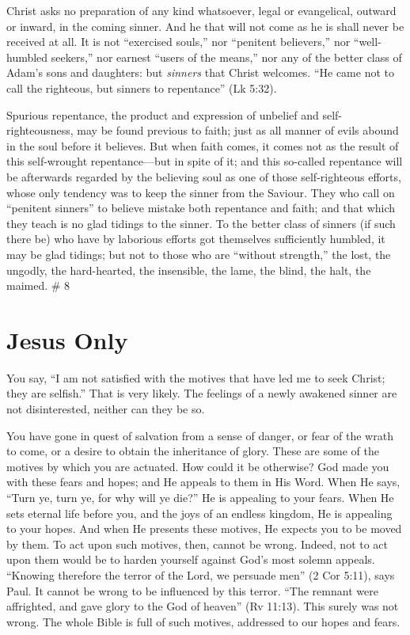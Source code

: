 \documentclass[
]{book}
\begin{document}
Christ asks no preparation of any kind whatsoever, legal or evangelical, outward or inward, in the coming sinner. And he that will not come as he is shall never be received at all. It is not ``exercised souls,'' nor ``penitent believers,'' nor ``well-humbled seekers,'' nor earnest ``users of the means,'' nor any of the better class of Adam's sons and daughters: but \emph{sinners} that Christ welcomes. ``He came not to call the righteous, but sinners to repentance'' (Lk 5:32).

Spurious repentance, the product and expression of unbelief and self-righteousness, may be found previous to faith; just as all manner of evils abound in the soul before it believes. But when faith comes, it comes not as the result of this self-wrought repentance---but in spite of it; and this so-called repentance will be afterwards regarded by the believing soul as one of those self-righteous efforts, whose only tendency was to keep the sinner from the Saviour. They who call on ``penitent sinners'' to believe mistake both repentance and faith; and that which they teach is no glad tidings to the sinner. To the better class of sinners (if such there be) who have by laborious efforts got themselves sufficiently humbled, it may be glad tidings; but not to those who are ``without strength,'' the lost, the ungodly, the hard-hearted, the insensible, the lame, the blind, the halt, the maimed.
\# 8

\hypertarget{jesus-only}{%
\chapter{Jesus Only}\label{jesus-only}}

You say, ``I am not satisfied with the motives that have led me to seek Christ; they are selfish.'' That is very likely. The feelings of a newly awakened sinner are not disinterested, neither can they be so.

You have gone in quest of salvation from a sense of danger, or fear of the wrath to come, or a desire to obtain the inheritance of glory. These are some of the motives by which you are actuated. How could it be otherwise? God made you with these fears and hopes; and He appeals to them in His Word. When He says, ``Turn ye, turn ye, for why will ye die?'' He is appealing to your fears. When He sets eternal life before you, and the joys of an endless kingdom, He is appealing to your hopes. And when He presents these motives, He expects you to be moved by them. To act upon such motives, then, cannot be wrong. Indeed, not to act upon them would be to harden yourself against God's most solemn appeals. ``Knowing therefore the terror of the Lord, we persuade men'' (2 Cor 5:11), says Paul. It cannot be wrong to be influenced by this terror. ``The remnant were affrighted, and gave glory to the God of heaven'' (Rv 11:13). This surely was not wrong. The whole Bible is full of such motives, addressed to our hopes and fears.
\end{document}
